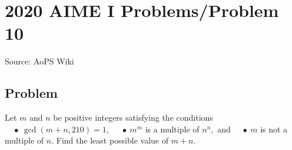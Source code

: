\documentclass[12pt]{article}
\begin{document}
\section*{{2020 AIME I Problems/Problem 10}}
Source: AoPS Wiki

\subsection*{Problem}
Let $m$ and $n$ be positive integers satisfying the conditions $\quad\bullet\ \gcd(m+n,210)=1,$ $\quad\bullet\ m^m$ is a multiple of $n^n,$ and $\quad\bullet\ m$ is not a multiple of $n.$ Find the least possible value of $m+n.$
\end{document}
